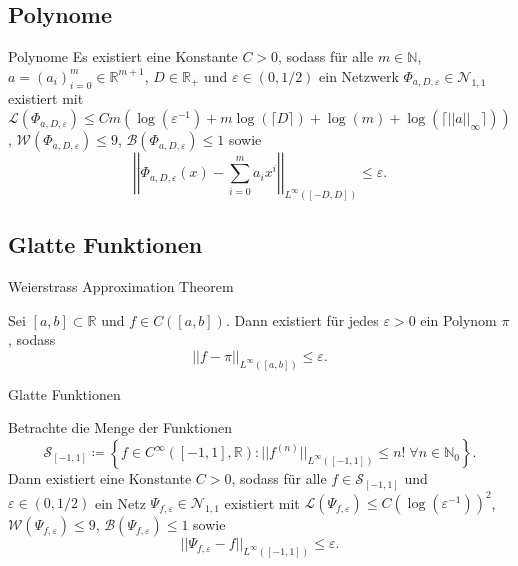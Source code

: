 \documentclass[10pt,aspectratio=169]{beamer}
\newcommand{\N}{\mathbb{N}} %
\newcommand{\R}{\mathbb{R}} %
\begin{document}
\subsection{Polynome}

\begin{frame}{Polynome} %
    \newcommand{\Phia}{\Phi_{a,D,\varepsilon}}
    Es existiert eine Konstante \(C>0\), sodass für alle \(m\in \N\), \(a = (a_i)_{i=0}^m \in \R^{m+1}\), 
    \(D\in \R_+\) und \(\varepsilon \in (0,1/2)\) ein Netzwerk \(\Phia \in \mathcal{N}_{1,1}\) 
    existiert mit \(\mathcal{L}(\Phia) \leq C m (\log(\varepsilon^{-1}) + m\log(\lceil D \rceil) + \log(m) + \log(\lceil ||a||_\infty \rceil))\), 
    \(\mathcal{W}(\Phia) \leq 9\), \(\mathcal{B}(\Phia) \leq 1\) sowie 
    \[ \left|\left|\Phia(x) - \sum_{i=0}^m a_i x^i \right|\right|_{L^\infty([-D,D])} \leq \varepsilon. \]
\end{frame}

\subsection{Glatte Funktionen}

\begin{frame}{Weierstrass Approximation Theorem} %
    \begin{theorem}
        Sei \([a,b] \subset \R\) und \(f\in C([a,b])\). Dann existiert für jedes \(\varepsilon > 0\) ein 
        Polynom \(\pi\), sodass 
        \[ ||f - \pi ||_{L^\infty([a,b])} \leq \varepsilon. \]
    \end{theorem}
\end{frame}

\begin{frame}{Glatte Funktionen}
    \begin{lemma} %
        Betrachte die Menge der Funktionen 
        \[ \mathcal{S}_{[-1,1]} \coloneqq \left\{ f \in C^\infty([-1,1], \R): ||f^{(n)}||_{L^\infty([-1,1])} \leq n! \;\forall n \in \N_0 \right\}. \]
        Dann existiert eine Konstante \(C>0\), sodass für alle \(f\in \mathcal{S}_{[-1,1]}\) und \(\varepsilon\in (0,1/2)\) 
        ein Netz \(\Psi_{f,\varepsilon} \in \mathcal{N}_{1,1}\) existiert mit 
        \( \mathcal{L}(\Psi_{f,\varepsilon}) \leq C(\log(\varepsilon^{-1}))^2 \), 
        \(\mathcal{W}(\Psi_{f,\varepsilon}) \leq 9\), \(\mathcal{B}(\Psi_{f,\varepsilon}) \leq 1\) 
        sowie 
        \[ ||\Psi_{f,\varepsilon} - f||_{L^\infty([-1,1])} \leq \varepsilon. \]
    \end{lemma}
\end{frame}
\end{document}
